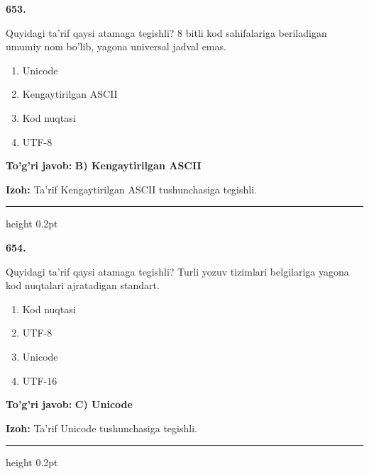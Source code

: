 \documentclass[10pt,a4paper,oneside]{article}
\begin{document}
\noindent\textbf{\color{ink}653.}
\par
Quyidagi ta'rif qaysi atamaga tegishli? 8 bitli kod sahifalariga beriladigan umumiy nom bo'lib, yagona universal jadval emas.
\begin{enumerate}[label=\Alph*),leftmargin=9mm]
\item Unicode
\item Kengaytirilgan ASCII
\item Kod nuqtasi
\item UTF-8
\end{enumerate}
\begin{tcolorbox}[enhanced,breakable,colback=teal!4,colframe=teal!50!black,boxrule=0.5pt,arc=1.1mm,left=3mm,right=3mm,top=1.7mm,bottom=1.7mm,before skip=2mm,after skip=2mm]
\textbf{\color{teal}To'g'ri javob:} \textbf{B) Kengaytirilgan ASCII}
\par\smallskip
\textbf{Izoh:} Ta'rif Kengaytirilgan ASCII tushunchasiga tegishli.
\end{tcolorbox}
\vspace{2mm}\hrule height 0.2pt \vspace{3mm}

\noindent\textbf{\color{ink}654.}
\par
Quyidagi ta'rif qaysi atamaga tegishli? Turli yozuv tizimlari belgilariga yagona kod nuqtalari ajratadigan standart.
\begin{enumerate}[label=\Alph*),leftmargin=9mm]
\item Kod nuqtasi
\item UTF-8
\item Unicode
\item UTF-16
\end{enumerate}
\begin{tcolorbox}[enhanced,breakable,colback=teal!4,colframe=teal!50!black,boxrule=0.5pt,arc=1.1mm,left=3mm,right=3mm,top=1.7mm,bottom=1.7mm,before skip=2mm,after skip=2mm]
\textbf{\color{teal}To'g'ri javob:} \textbf{C) Unicode}
\par\smallskip
\textbf{Izoh:} Ta'rif Unicode tushunchasiga tegishli.
\end{tcolorbox}
\vspace{2mm}\hrule height 0.2pt \vspace{3mm}
\end{document}
